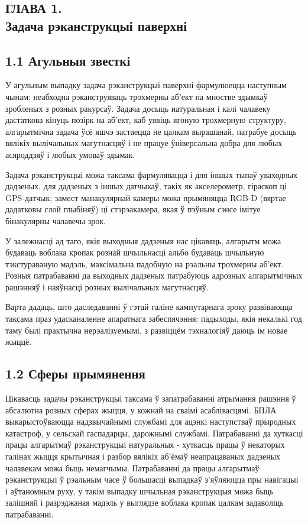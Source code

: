 \begin{center}
    \section*{ГЛАВА 1. \\ Задача рэканструкцыі паверхні}
\end{center}

\subsection*{1.1 Агульныя звесткі}

У агульным выпадку задача рэканструкцыі паверхні фармулюецца наступным чынам:
неабходна рэканструяваць трохмерны аб'ект па мностве здымкаў зробленых з розных ракурсаў.
Задача досыць натуральная і калі чалавеку дастаткова кінуць
позірк на аб'ект, каб уявіць ягоную трохмерную структуру, алгарытмічна задача
ўсё яшчэ застаецца не цалкам вырашанай, патрабуе досыць вялікіх вылічальных магутнасцяў
і не працуе ўніверсальна добра для любых асяроддзяў і любых умоваў здымак.

Задача рэканструкцыі можа таксама фармулявацца і для іншых тыпаў уваходных дадзеных,
для дадзеных з іншых датчыкаў, такіх як акселерометр, гіраскоп ці GPS-датчык;
замест манакулярнай камеры можа прымяняцца RGB-D (вяртае дадатковы слой глыбіняў)
ці стэрэакамера, якая ў пэўным сэнсе імітуе бінакулярны чалавечы зрок.

У залежнасці ад таго, якія выходныя дадзеныя нас цікавяць, алгарытм можа будаваць
воблака кропак рознай шчыльнасці альбо будаваць шчыльную тэкстураваную мадэль,
максімальна падобную на рэальны трохмерны аб'ект. Розныя патрабаванні да выходных
дадзеных патрабуюць адрозных алгарытмічных рашэнняў і наяўнасці розных вылічальных магутнасцяў.

Варта дадаць, што даследаванні ў гэтай галіне кампутарнага зроку развіваюцца
таксама праз удасканаленне апаратнага забеспячэння: падыходы, якія некалькі год
таму былі практычна нерэалізуемымі, з развіццём тэхналогіяў даюць ім новае жыццё.

\subsection*{1.2 Сферы прымянення}

Цікавасць задачы рэканструкцыі таксама ў запатрабаванні атрымання рашэння ў абсалютна розных сферах
жыцця, у кожнай на сваімі асаблівасцямі.
БПЛА выкарыстоўваюцца надзвычайнымі службамі для ацэнкі наступстваў прыродных катастроф,
у сельскай гаспадарцы, дарожнымі службамі. Патрабаванні да хуткасці працы алгарытмаў рэканструкцыі
натуральныя - хуткасць працы ў некаторых галінах жыцця крытычная і разбор вялікіх аб'ёмаў
неапрацаваных дадзеных чалавекам можа быць немагчымы. Патрабаванні да працы алгарытмаў
рэканструкцыі ў рэальным часе ў большасці выпадкаў з'яўляюцца пры навігацыі і
аўтаномным руху, у такім выпадку шчыльная рэканструкцыя можа быць залішняй і
разрэджаная мадэль у выглядзе воблака кропак цалкам задаволіць патрабаванні.

\newpage
